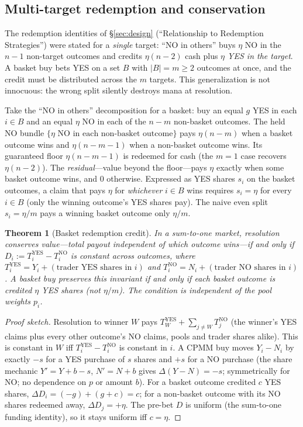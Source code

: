 \documentclass[11pt]{article}
\newtheorem{theorem}{Theorem}[section]
\begin{document}
\subsection{Multi-target redemption and conservation}
\label{sec:multitarget}

The redemption identities of \S\ref{sec:design} (``Relationship to Redemption Strategies'') were stated for a \emph{single} target: ``NO in others'' buys $\eta$ NO in the $n-1$ non-target outcomes and credits $\eta(n-2)$ cash plus \emph{$\eta$ YES in the target}. A basket buy bets YES on a set $B$ with $|B| = m \ge 2$ outcomes at once, and the credit must be distributed across the $m$ targets. This generalization is not innocuous: the wrong split silently destroys mana at resolution.

Take the ``NO in others'' decomposition for a basket: buy an equal $g$ YES in each $i \in B$ and an equal $\eta$ NO in each of the $n-m$ non-basket outcomes. The held NO bundle $\{\eta \text{ NO in each non-basket outcome}\}$ pays $\eta(n-m)$ when a basket outcome wins and $\eta(n-m-1)$ when a non-basket outcome wins. Its guaranteed floor $\eta(n-m-1)$ is redeemed for cash (the $m=1$ case recovers $\eta(n-2)$). The \emph{residual}---value beyond the floor---pays $\eta$ exactly when some basket outcome wins, and $0$ otherwise. Expressed as YES shares $s_i$ on the basket outcomes, a claim that pays $\eta$ for \emph{whichever} $i \in B$ wins requires $s_i = \eta$ for every $i \in B$ (only the winning outcome's YES shares pay). The naive even split $s_i = \eta/m$ pays a winning basket outcome only $\eta/m$.

\begin{theorem}[Basket redemption credit]
\label{thm:basket-redemption}
In a sum-to-one market, resolution conserves value---total payout independent of which outcome wins---if and only if $D_i := T_i^{\mathrm{YES}} - T_i^{\mathrm{NO}}$ is constant across outcomes, where $T_i^{\mathrm{YES}} = Y_i + (\text{trader YES shares in } i)$ and $T_i^{\mathrm{NO}} = N_i + (\text{trader NO shares in } i)$. A basket buy preserves this invariant if and only if each basket outcome is credited $\eta$ YES shares (not $\eta/m$). The condition is independent of the pool weights $p_i$.
\end{theorem}

\begin{proof}[Proof sketch]
Resolution to winner $W$ pays $T_W^{\mathrm{YES}} + \sum_{j \ne W} T_j^{\mathrm{NO}}$ (the winner's YES claims plus every other outcome's NO claims, pools and trader shares alike). This is constant in $W$ iff $T_i^{\mathrm{YES}} - T_i^{\mathrm{NO}}$ is constant in $i$. A CPMM buy moves $Y_i - N_i$ by exactly $-s$ for a YES purchase of $s$ shares and $+s$ for a NO purchase (the share mechanic $Y' = Y + b - s$, $N' = N + b$ gives $\Delta(Y-N) = -s$; symmetrically for NO; no dependence on $p$ or amount $b$). For a basket outcome credited $c$ YES shares, $\Delta D_i = (-g) + (g + c) = c$; for a non-basket outcome with its NO shares redeemed away, $\Delta D_j = +\eta$. The pre-bet $D$ is uniform (the sum-to-one funding identity), so it stays uniform iff $c = \eta$.
\end{proof}
\end{document}
